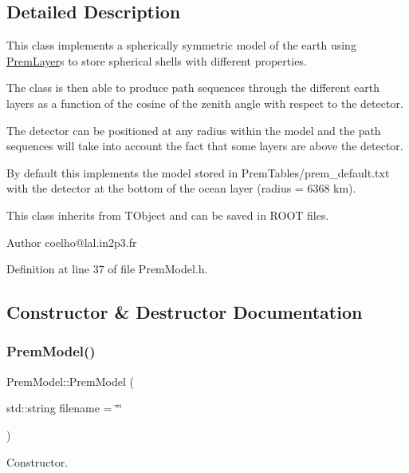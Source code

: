 \subsection{Detailed Description}
This class implements a spherically symmetric model of the earth using \hyperlink{structOscProb_1_1PremLayer}{Prem\+Layer}\textquotesingle{}s to store spherical shells with different properties.

The class is then able to produce path sequences through the different earth layers as a function of the cosine of the zenith angle with respect to the detector.

The detector can be positioned at any radius within the model and the path sequences will take into account the fact that some layers are above the detector.

By default this implements the model stored in Prem\+Tables/prem\+\_\+default.\+txt with the detector at the bottom of the ocean layer (radius = 6368 km).

This class inherits from T\+Object and can be saved in R\+O\+OT files.

\begin{DoxyAuthor}{Author}
coelho@lal.\+in2p3.\+fr 
\end{DoxyAuthor}


Definition at line 37 of file Prem\+Model.\+h.



\subsection{Constructor \& Destructor Documentation}
\mbox{\label{classOscProb_1_1PremModel_a959f8da5c78881b950bd647b67c1ef9b}} 
\subsubsection{\texorpdfstring{Prem\+Model()}{PremModel()}}
{\footnotesize\ttfamily Prem\+Model\+::\+Prem\+Model (\begin{DoxyParamCaption}\item[{std\+::string}]{filename = {\ttfamily \char`\"{}\char`\"{}} }\end{DoxyParamCaption})}

Constructor.

